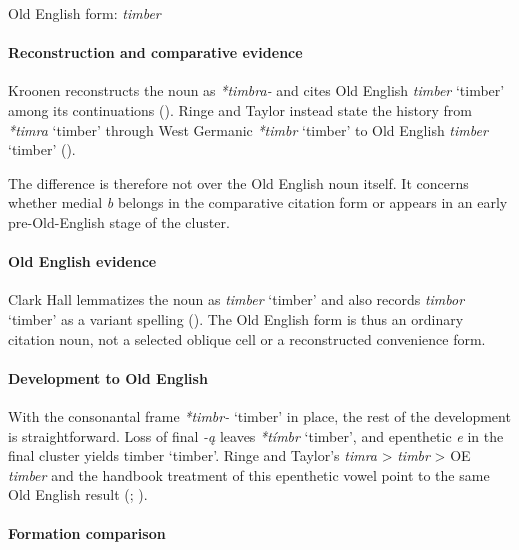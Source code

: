 \documentclass[
  british,
  a4paper,
]{article}
\providecommand{\Recon}[1]{\emph{*#1}}
\begin{document}
Old English form: \emph{timber}

\paragraph{Reconstruction and comparative
evidence}\label{reconstruction-and-comparative-evidence-109}

Kroonen reconstructs the noun as {\emph{*timbra-}} and cites Old English
{\emph{timber}} `timber' among its continuations
(). Ringe and Taylor
instead state the history from \Recon{timra} `timber' through West
Germanic \Recon{timbr} `timber' to Old English {\emph{timber}} `timber'
().

The difference is therefore not over the Old English noun itself. It
concerns whether medial \emph{b} belongs in the comparative citation
form or appears in an early pre-Old-English stage of the cluster.

\paragraph{Old English evidence}\label{old-english-evidence-109}

Clark Hall lemmatizes the noun as {\emph{timber}} `timber' and also
records {\emph{timbor}} `timber' as a variant spelling
(). The Old English
form is thus an ordinary citation noun, not a selected oblique cell or a
reconstructed convenience form.

\paragraph{Development to Old
English}\label{development-to-old-english-109}

With the consonantal frame \Recon{timbr-} `timber' in place, the rest of
the development is straightforward. Loss of final \emph{-ą} leaves
\Recon{tímbr} `timber', and epenthetic \emph{e} in the final cluster
yields {timber} `timber'. Ringe and Taylor's \emph{timra} \textgreater{}
\emph{timbr} \textgreater{} OE \emph{timber} and the handbook treatment
of this epenthetic vowel point to the same Old English result
(;
).

\paragraph{Formation comparison}\label{formation-comparison-6}
\end{document}
